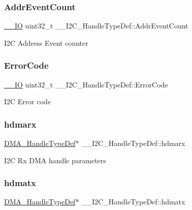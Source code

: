 \subsubsection{\texorpdfstring{AddrEventCount}{AddrEventCount}}
{\footnotesize\ttfamily \mbox{\hyperlink{core__sc300_8h_aec43007d9998a0a0e01faede4133d6be}{\+\_\+\+\_\+\+IO}} uint32\+\_\+t \+\_\+\+\_\+\+I2\+C\+\_\+\+Handle\+Type\+Def\+::\+Addr\+Event\+Count}

I2C Address Event counter \mbox{\label{struct_____i2_c___handle_type_def_a824099e364465827123cda831284f643}} 
\subsubsection{\texorpdfstring{ErrorCode}{ErrorCode}}
{\footnotesize\ttfamily \mbox{\hyperlink{core__sc300_8h_aec43007d9998a0a0e01faede4133d6be}{\+\_\+\+\_\+\+IO}} uint32\+\_\+t \+\_\+\+\_\+\+I2\+C\+\_\+\+Handle\+Type\+Def\+::\+Error\+Code}

I2C Error code \mbox{\label{struct_____i2_c___handle_type_def_a52dcaac577eef13388d209f3f5a6a4b9}} 
\subsubsection{\texorpdfstring{hdmarx}{hdmarx}}
{\footnotesize\ttfamily \mbox{\hyperlink{group___d_m_a___exported___types_ga41b754a906b86bce54dc79938970138b}{D\+M\+A\+\_\+\+Handle\+Type\+Def}}$\ast$ \+\_\+\+\_\+\+I2\+C\+\_\+\+Handle\+Type\+Def\+::hdmarx}

I2C Rx D\+MA handle parameters \mbox{\label{struct_____i2_c___handle_type_def_ad8f3153daebc780294797b448decb190}} 
\subsubsection{\texorpdfstring{hdmatx}{hdmatx}}
{\footnotesize\ttfamily \mbox{\hyperlink{group___d_m_a___exported___types_ga41b754a906b86bce54dc79938970138b}{D\+M\+A\+\_\+\+Handle\+Type\+Def}}$\ast$ \+\_\+\+\_\+\+I2\+C\+\_\+\+Handle\+Type\+Def\+::hdmatx}

